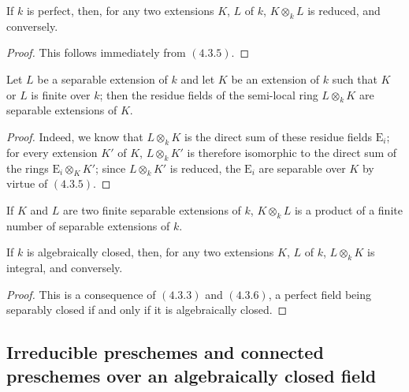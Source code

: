 \begin{corollary}[4.3.6]
\label{IV.4.3.6}
If $k$ is perfect, then, for any two extensions $K$, $L$ of $k$, $K\otimes_k L$ is reduced, and conversely.
\end{corollary}

\begin{proof}
This follows immediately from $(4.3.5)$.
\end{proof}

\begin{corollary}[4.3.7]
\label{IV.4.3.7}
Let $L$ be a separable extension of $k$ and let $K$ be an extension of $k$ such that $K$ or $L$ is finite over $k$; then the residue fields of the semi-local ring $L\otimes_k K$ are separable extensions of $K$.
\end{corollary}

\begin{proof}
Indeed, we know that $L\otimes_k K$ is the direct sum of these residue fields $\mathrm{E}_i$; for every extension $K'$ of $K$, $L\otimes_k K'$ is therefore isomorphic to the direct sum of the rings $\mathrm{E}_i\otimes_K K'$; since $L\otimes_k K'$ is reduced, the $\mathrm{E}_i$ are separable over $K$ by virtue of $(4.3.5)$.
\end{proof}

\begin{corollary}[4.3.8]
\label{IV.4.3.8}
If $K$ and $L$ are two finite separable extensions of $k$, $K\otimes_k L$ is a product of a finite number of separable extensions of $k$.
\end{corollary}

\begin{proposition}[4.3.9]
\label{IV.4.3.9}
If $k$ is algebraically closed, then, for any two extensions $K$, $L$ of $k$, $L\otimes_k K$ is integral, and conversely.
\end{proposition}

\begin{proof}
This is a consequence of $(4.3.3)$ and $(4.3.6)$, a perfect field being separably closed if and only if it is algebraically closed.
\end{proof}

\subsection{Irreducible preschemes and connected preschemes over an algebraically closed field}
\label{subsection:IV.4.4}


